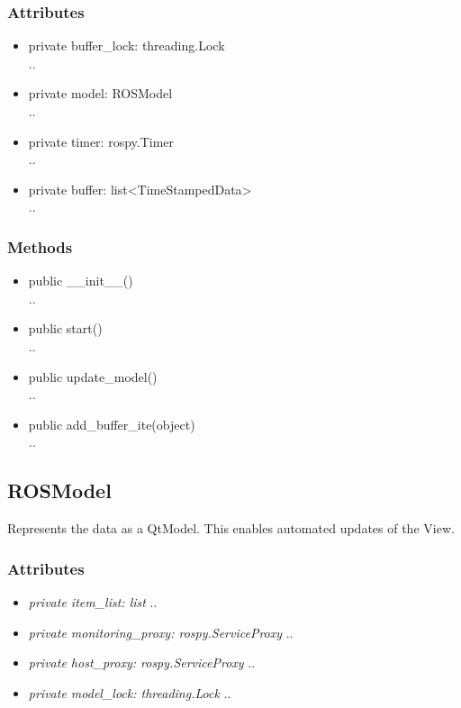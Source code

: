 \subsubsection{Attributes}
\begin{itemize}
  \item private buffer\_lock: threading.Lock\\
  ..
  \item private model: ROSModel\\
  ..
  \item private timer: rospy.Timer\\
  ..
  \item private buffer: list<TimeStampedData>\\
  ..
\end{itemize}
\subsubsection{Methods}
\begin{itemize}
  \item public \_\_init\_\_()\\
  ..
  \item public start()\\
  ..
  \item public update\_model()\\
  ..
  \item public add\_buffer\_ite(object)\\
  ..
\end{itemize}

\subsection{ROSModel}
Represents the data as a QtModel. This enables automated updates of the View.
\subsubsection{Attributes}
\begin{itemize}
  \item \textit{private item\_list: list}
  ..
  \item \textit{private monitoring\_proxy: rospy.ServiceProxy}
  ..
  \item \textit{private host\_proxy: rospy.ServiceProxy}
  ..  
  \item \textit{private model\_lock: threading.Lock}
  ..
\end{itemize}

